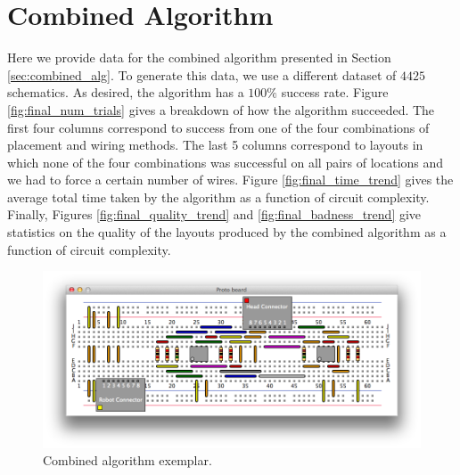 \section{Combined Algorithm}

Here we provide data for the combined algorithm presented in Section
\ref{sec:combined_alg}. To generate this data, we use a different dataset of
$4425$ schematics. As desired, the algorithm has a $100\%$ success rate.
Figure \ref{fig:final_num_trials} gives a breakdown of how the algorithm
succeeded. The first four columns correspond to success from one of the four
combinations of placement and wiring methods. The last 5 columns correspond to
layouts in which none of the four combinations was successful on all pairs of
locations and we had to
force a certain number of wires. Figure
\ref{fig:final_time_trend} gives the average total time taken by the algorithm
as a function of circuit complexity. Finally, Figures
\ref{fig:final_quality_trend} and \ref{fig:final_badness_trend}
give statistics on the quality of the layouts produced by the combined algorithm
as a function of circuit complexity.

\begin{figure}[H]
\begin{center}
\includegraphics[width=\textwidth]{Images/exemplar_combined_algorithm.png}
\caption{Combined algorithm exemplar.}
\end{center}
\end{figure}

